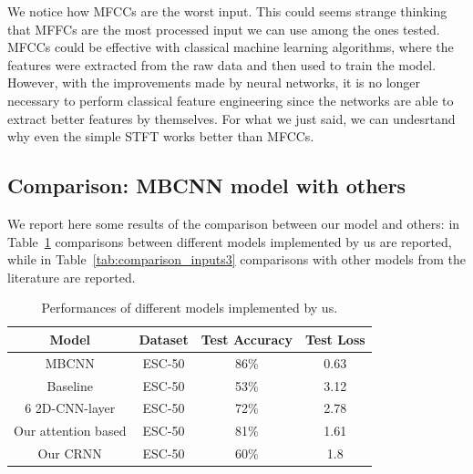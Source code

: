 \documentclass{article}
\begin{document}
\begin{sloppy}
We notice how MFCCs are the worst input. This could seems strange thinking that MFFCs are the most processed input we can use among the ones tested.
MFCCs could be effective with classical machine learning algorithms, where the features were extracted from the raw data and then used to train the model.
However, with the improvements made by neural networks, it is no longer necessary to perform classical feature engineering since the networks
are able to extract better features by themselves. For what we just said, we can undesrtand why even the simple
STFT works better than MFCCs.

\subsection{Comparison: MBCNN model with others}
\label{sec:comparison_2}
We report here some results of the comparison between our model and others: in Table~\ref{tab:comparison_inputs2} comparisons between
different models implemented by us are reported, while in Table~\ref{tab:comparison_inputs3} comparisons with other models from the literature are reported.

\begin{table}[ht]
  \centering
  \caption{Performances of different models implemented by us.}
  \label{tab:comparison_inputs2}
  \begin{tabular}{|c|c|c|c|}
    \hline
    Model & Dataset & Test Accuracy & Test Loss \\
    \hline
    MBCNN & ESC-50 & 86\% & 0.63 \\
    Baseline & ESC-50  & 53\% & 3.12 \\
    6 2D-CNN-layer & ESC-50  & 72\% & 2.78 \\
    Our attention based & ESC-50  & 81\% & 1.61 \\
    Our CRNN & ESC-50  & 60\% & 1.8 \\
    \hline
  \end{tabular}
\end{table}


\end{sloppy}
\end{document}
